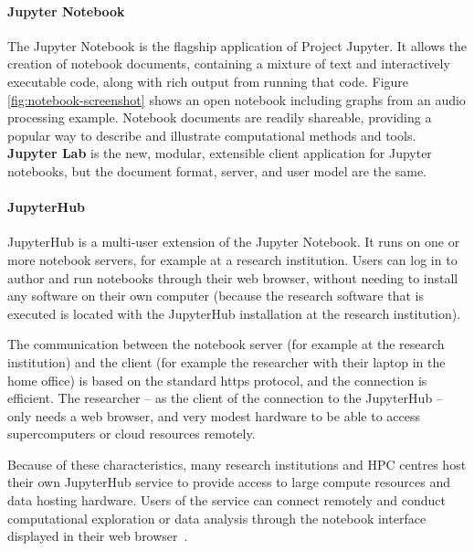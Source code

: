 \paragraph{Jupyter Notebook}\label{sec:jupyter-notebook} The Jupyter Notebook is
the flagship application of Project Jupyter. 
It allows the creation of notebook documents, containing a mixture of text and
interactively executable code, along with rich output from running that code.
Figure \ref{fig:notebook-screenshot} shows an open notebook including graphs
from an audio processing example. Notebook documents are readily shareable,
providing a popular way to describe and illustrate computational methods and
tools.  \textbf{Jupyter Lab} is the new, modular, extensible
client application for Jupyter notebooks, but the document format, server, and
user model are the same.

\paragraph{JupyterHub}\label{sec:jupyterhub} JupyterHub is a multi-user extension of the Jupyter Notebook.
It runs on one or more notebook servers, for example at a research institution.
Users can log in to author and run notebooks through their web browser, without
needing to install any software on their own computer (because the research
software that is executed is located with the JupyterHub installation at the
research institution).

The communication between the notebook server (for example at the research
institution) and the client (for example the researcher with their laptop in the
home office) is based on the standard https protocol, and the connection is
efficient. The researcher -- as the client of the connection to the JupyterHub --
only needs a web browser, and very modest hardware to be able to access
supercomputers or cloud resources remotely.


Because of these characteristics, many research institutions and HPC centres host their own
JupyterHub service to provide access to large compute resources and data hosting
hardware. Users of the service can connect remotely and conduct computational
exploration or data analysis through the notebook interface displayed in their
web browser~\cite{Fangohr2020}.
% 


